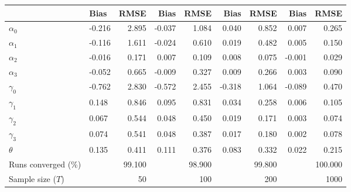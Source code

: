 
\begin{tabular}[t]{llrrrrrrr}
\toprule
  & Bias & RMSE & Bias & RMSE & Bias & RMSE & Bias & RMSE\\
\midrule
$\alpha_{0}$ & -0.216 & 2.895 & -0.037 & 1.084 & 0.040 & 0.852 & 0.007 & 0.265\\
$\alpha_{1}$ & -0.116 & 1.611 & -0.024 & 0.610 & 0.019 & 0.482 & 0.005 & 0.150\\
$\alpha_{2}$ & -0.016 & 0.171 & 0.007 & 0.109 & 0.008 & 0.075 & -0.001 & 0.029\\
$\alpha_{3}$ & -0.052 & 0.665 & -0.009 & 0.327 & 0.009 & 0.266 & 0.003 & 0.090\\
$\gamma_{0}$ & -0.762 & 2.830 & -0.572 & 2.455 & -0.318 & 1.064 & -0.089 & 0.470\\
$\gamma_{1}$ & 0.148 & 0.846 & 0.095 & 0.831 & 0.034 & 0.258 & 0.006 & 0.105\\
$\gamma_{2}$ & 0.067 & 0.544 & 0.048 & 0.450 & 0.019 & 0.171 & 0.003 & 0.074\\
$\gamma_{3}$ & 0.074 & 0.541 & 0.048 & 0.387 & 0.017 & 0.180 & 0.002 & 0.078\\
$\theta$ & 0.135 & 0.411 & 0.111 & 0.376 & 0.083 & 0.332 & 0.022 & 0.215\\
Runs converged (\%) &  & 99.100 &  & 98.900 &  & 99.800 &  & 100.000\\
Sample size ($T$) &  & 50 &  & 100 &  & 200 &  & 1000\\
\bottomrule
\end{tabular}
